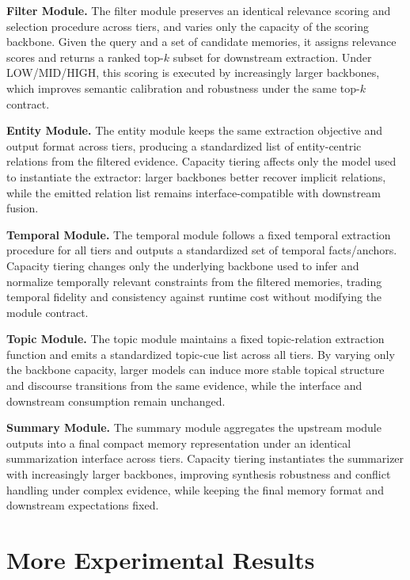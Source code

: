 \textbf{Filter Module.}
The filter module preserves an identical relevance scoring and selection procedure across tiers, and varies only the capacity of the scoring backbone. Given the query and a set of candidate memories, it assigns relevance scores and returns a ranked top-$k$ subset for downstream extraction. Under \textsc{LOW}/\textsc{MID}/\textsc{HIGH}, this scoring is executed by increasingly larger backbones, which improves semantic calibration and robustness under the same top-$k$ contract.

\textbf{Entity Module.}
The entity module keeps the same extraction objective and output format across tiers, producing a standardized list of entity-centric relations from the filtered evidence. Capacity tiering affects only the model used to instantiate the extractor: larger backbones better recover implicit relations, while the emitted relation list remains interface-compatible with downstream fusion.

\textbf{Temporal Module.}
The temporal module follows a fixed temporal extraction procedure for all tiers and outputs a standardized set of temporal facts/anchors. Capacity tiering changes only the underlying backbone used to infer and normalize temporally relevant constraints from the filtered memories, trading temporal fidelity and consistency against runtime cost without modifying the module contract.

\textbf{Topic Module.}
The topic module maintains a fixed topic-relation extraction function and emits a standardized topic-cue list across all tiers. By varying only the backbone capacity, larger models can induce more stable topical structure and discourse transitions from the same evidence, while the interface and downstream consumption remain unchanged.

\textbf{Summary Module.}
The summary module aggregates the upstream module outputs into a final compact memory representation under an identical summarization interface across tiers. Capacity tiering instantiates the summarizer with increasingly larger backbones, improving synthesis robustness and conflict handling under complex evidence, while keeping the final memory format and downstream expectations fixed.



\section{More Experimental Results}
\label{appendix:exp_results}



